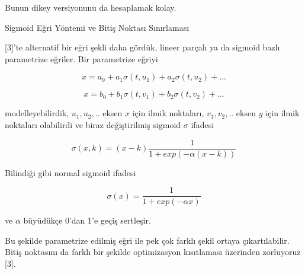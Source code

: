\documentclass[12pt,fleqn]{article}\usepackage{../../common}
\begin{document}
Bunun dikey versiyonunu da hesaplamak kolay.

Sigmoid Eğri Yöntemi ve Bitiş Noktası Sınırlaması

[3]'te alternatif bir eğri şekli daha gördük, lineer parçalı ya da sigmoid
bazlı parametrize eğriler. Bir parametrize eğriyi 

$$
x = a_0 + a_1 \sigma(t,u_1) + a_2 \sigma(t,u_2) + ... 
$$

$$
x = b_0 + b_1 \sigma(t,v_1) + b_2 \sigma(t,v_2) + ... 
$$

modelleyebilirdik, $u_1,u_2,..$ eksen $x$ için ilmik noktaları,
$v_1,v_2,..$ eksen $y$ için ilmik noktaları olabilirdi ve biraz
değiştirilmiş sigmoid $\sigma$ ifadesi

$$
\sigma (x,k) = (x-k) \frac{1}{1 + exp(-\alpha (x-k))}
$$

Bilindiği gibi normal sigmoid ifadesi

$$
\sigma (x) = \frac{1}{1 + exp(-\alpha x)}
$$

ve $\alpha$ büyüdükçe 0'dan 1'e geçiş sertleşir. 

Bu şekilde parametrize edilmiş eğri ile pek çok farklı şekil ortaya
çıkartılabilir. Bitiş noktasını da farklı bir şekilde optimizasyon kısıtlaması
üzerinden zorluyoruz [3].
\end{document}
